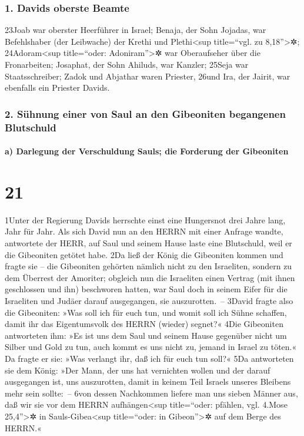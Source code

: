 \hypertarget{davids-oberste-beamte}{%
\subsubsection{1. Davids oberste Beamte}\label{davids-oberste-beamte}}

23Joab war oberster Heerführer in Israel; Benaja, der Sohn Jojadas, war
Befehlshaber (der Leibwache) der Krethi und Plethi\textless sup
title=``vgl. zu 8,18''\textgreater✲; 24Adoram\textless sup title=``oder:
Adoniram''\textgreater✲ war Oberaufseher über die Fronarbeiten;
Josaphat, der Sohn Ahiluds, war Kanzler; 25Seja war Staatsschreiber;
Zadok und Abjathar waren Priester, 26und Ira, der Jairit, war ebenfalls
ein Priester Davids.

\hypertarget{suxfchnung-einer-von-saul-an-den-gibeoniten-begangenen-blutschuld}{%
\subsubsection{2. Sühnung einer von Saul an den Gibeoniten begangenen
Blutschuld}\label{suxfchnung-einer-von-saul-an-den-gibeoniten-begangenen-blutschuld}}

\hypertarget{a-darlegung-der-verschuldung-sauls-die-forderung-der-gibeoniten}{%
\paragraph{a) Darlegung der Verschuldung Sauls; die Forderung der
Gibeoniten}\label{a-darlegung-der-verschuldung-sauls-die-forderung-der-gibeoniten}}

\hypertarget{section-20}{%
\section{21}\label{section-20}}

1Unter der Regierung Davids herrschte einst eine Hungersnot drei Jahre
lang, Jahr für Jahr. Als sich David nun an den HERRN mit einer Anfrage
wandte, antwortete der HERR, auf Saul und seinem Hause laste eine
Blutschuld, weil er die Gibeoniten getötet habe. 2Da ließ der König die
Gibeoniten kommen und fragte sie -- die Gibeoniten gehörten nämlich
nicht zu den Israeliten, sondern zu dem Überrest der Amoriter; obgleich
nun die Israeliten einen Vertrag (mit ihnen geschlossen und ihn)
beschworen hatten, war Saul doch in seinem Eifer für die Israeliten und
Judäer darauf ausgegangen, sie auszurotten.~-- 3David fragte also die
Gibeoniten: »Was soll ich für euch tun, und womit soll ich Sühne
schaffen, damit ihr das Eigentumsvolk des HERRN (wieder) segnet?« 4Die
Gibeoniten antworteten ihm: »Es ist uns dem Saul und seinem Hause
gegenüber nicht um Silber und Gold zu tun, auch kommt es uns nicht zu,
jemand in Israel zu töten.« Da fragte er sie: »Was verlangt ihr, daß ich
für euch tun soll?« 5Da antworteten sie dem König: »Der Mann, der uns
hat vernichten wollen und der darauf ausgegangen ist, uns auszurotten,
damit in keinem Teil Israels unseres Bleibens mehr sein sollte:~-- 6von
dessen Nachkommen liefere man uns sieben Männer aus, daß wir sie vor dem
HERRN aufhängen\textless sup title=``oder: pfählen, vgl. 4.Mose
25,4''\textgreater✲ in Sauls-Gibea\textless sup title=``oder: in
Gibeon''\textgreater✲ auf dem Berge des HERRN.«

